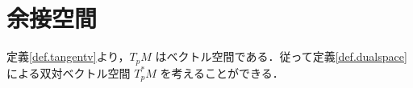 \documentclass[geometry_main]{subfiles}
\begin{document}







\section{余接空間}

定義\ref{def.tangentv}より，$T_pM$ はベクトル空間である．従って定義\ref{def.dualspace}による双対ベクトル空間 $T_p^* M$ を考えることができる．
\end{document}

